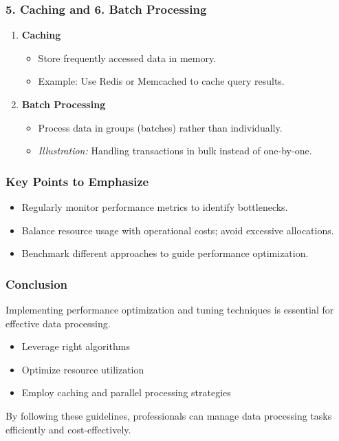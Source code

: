 \documentclass{beamer}
\begin{document}
\begin{frame}[fragile]
    \frametitle{5. Caching and 6. Batch Processing}
    \begin{enumerate}
        \item \textbf{Caching}
            \begin{itemize}
                \item Store frequently accessed data in memory.
                \item Example: Use Redis or Memcached to cache query results.
            \end{itemize}
        \item \textbf{Batch Processing}
            \begin{itemize}
                \item Process data in groups (batches) rather than individually.
                \item \textit{Illustration:} Handling transactions in bulk instead of one-by-one.
            \end{itemize}
    \end{enumerate}
\end{frame}

\begin{frame}[fragile]
    \frametitle{Key Points to Emphasize}
    \begin{itemize}
        \item Regularly monitor performance metrics to identify bottlenecks.
        \item Balance resource usage with operational costs; avoid excessive allocations.
        \item Benchmark different approaches to guide performance optimization.
    \end{itemize}
\end{frame}

\begin{frame}[fragile]
    \frametitle{Conclusion}
    Implementing performance optimization and tuning techniques is essential for effective data processing. 
    \begin{itemize}
        \item Leverage right algorithms
        \item Optimize resource utilization
        \item Employ caching and parallel processing strategies
    \end{itemize}
    By following these guidelines, professionals can manage data processing tasks efficiently and cost-effectively.
\end{frame}
\end{document}
